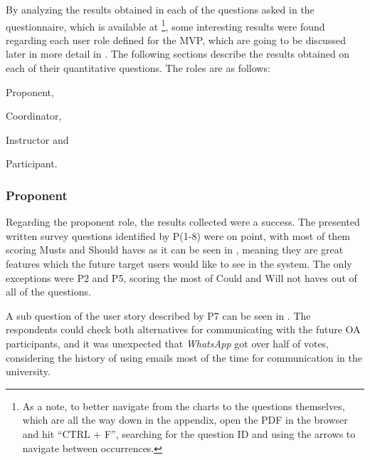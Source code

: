 By analyzing the results obtained in each of the questions asked in the questionnaire, which is available at \footnote{As a note, to better navigate from the charts to the questions themselves, which are all the way down in the appendix, open the PDF in the browser and hit ``CTRL + F'', searching for the question \ac{ID} and using the arrows to navigate between occurrences.}, some interesting results were found regarding each user role defined for the \ac{MVP}, which are going to be discussed later in more detail in . The following sections describe the results obtained on each of their quantitative questions. The roles are as follows:
\begin{inparaenum}[(a)]
  \item Proponent,
  \item Coordinator,
  \item Instructor and
  \item Participant.
\end{inparaenum}

\subsubsection{Proponent}\label{sec:survey-quant-proponent}

Regarding the proponent role, the results collected were a success. The presented written survey questions identified by P(1-8) were on point, with most of them scoring Musts and Should haves as it can be seen in , meaning they are great features which the future target users would like to see in the system. The only exceptions were P2 and P5, scoring the most of Could and Will not haves out of all of the questions.

A sub question of the user story described by P7 can be seen in . The respondents could check both alternatives for communicating with the future \ac{OA} participants, and it was unexpected that \textit{WhatsApp} got over half of votes, considering the history of using emails most of the time for communication in the university.

